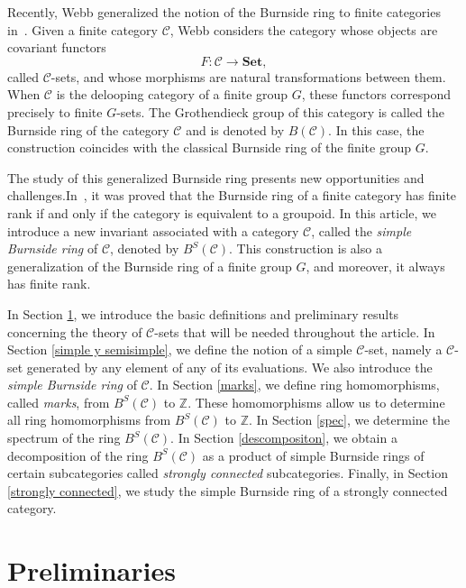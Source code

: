 \documentclass[a4paper]{article}
\theoremstyle{definition}
\theoremstyle{remark}
\newcommand*{\cat}[1]{\mathcal{#1}}
\begin{document}
Recently,  Webb generalized the notion of the Burnside ring to finite categories in~\cite{Webb23}. Given a finite category $\cat{C}$, Webb considers the category whose objects are covariant functors
\[
F \colon \cat{C} \longrightarrow \mathbf{Set},
\]
called $\cat{C}$-sets, and whose morphisms are natural transformations between them. When $\cat{C}$ is the delooping category of a finite group $G$, these functors correspond precisely to finite $G$-sets. The Grothendieck group of this category is called the Burnside ring of the category $\cat{C}$ and is denoted by $B(\cat{C})$. In this case, the construction coincides with the classical Burnside ring of the finite group $G$.

The study of this generalized Burnside ring presents new opportunities and challenges.In~\cite{semisimple}, it was proved that the Burnside ring of a finite category has finite rank if and only if the category is equivalent to a groupoid.
In this article, we introduce a new invariant associated with a category $\cat{C}$, called the \emph{simple Burnside ring} of $\cat{C}$, denoted by $B^S(\cat{C})$. This construction is also a generalization of the Burnside ring of a finite group $G$, and moreover, it always has finite rank.

In Section \ref{Preliminares}, we introduce the basic definitions and preliminary results concerning the theory of $\cat{C}$-sets that will be needed throughout the article. In Section \ref{simple y semisimple}, we define the notion of a simple $\cat{C}$-set, namely a $\cat{C}$-set generated by any element of any of its evaluations. We also introduce the \emph{simple Burnside ring} of $\cat{C}$. In Section \ref{marks}, we define ring homomorphisms, called \emph{marks}, from $B^S(\cat{C})$ to $\mathbb{Z}$. These homomorphisms allow us to determine all ring homomorphisms from $B^S(\cat{C})$ to $\mathbb{Z}$. In Section \ref{spec}, we determine the spectrum of the ring $B^S(\cat{C})$. In Section \ref{descompositon}, we obtain a decomposition of the ring $B^S(\cat{C})$ as a product of simple Burnside rings of certain subcategories called \emph{strongly connected} subcategories. Finally, in Section \ref{strongly connected}, we study the simple Burnside ring of a strongly connected category.

\section{Preliminaries}\label{Preliminares}
\end{document}

